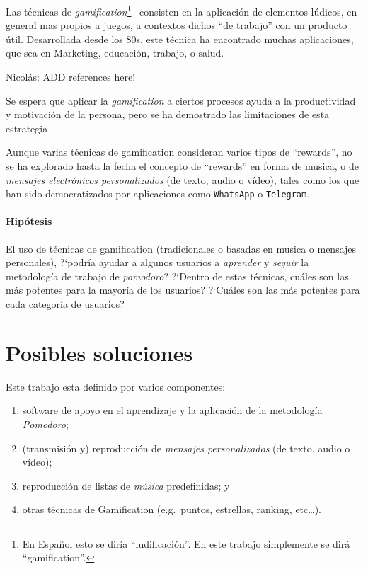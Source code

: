 \documentclass[12pt,letterpaper]{report}
\providecommand{\tightlist}{%
  \setlength{\itemsep}{0pt}\setlength{\parskip}{0pt}}
\let\oldparagraph\paragraph
\renewcommand{\paragraph}[1]{\oldparagraph{#1}\mbox{}}
\begin{document}
Las técnicas de \emph{gamification}\footnote{En Español esto se diría
``ludificación''. En este trabajo simplemente se dirá
``gamification''.}~\cite{deterding2011gamification} consisten en la aplicación de
elementos lúdicos, en general mas propios a juegos, a contextos dichos ``de
trabajo'' con un producto útil.  Desarrollada desde los 80s, este técnica ha
encontrado muchas aplicaciones, que sea en Marketing, educación, trabajo, o
salud.
\begin{TODO}
Nicolás: ADD references here!
\end{TODO}
Se espera que aplicar la \emph{gamification} a ciertos procesos ayuda a la
productividad y motivación de la persona, pero se ha demostrado las
limitaciones de esta estrategia~\cite{hamari2014gamification}.

Aunque varias técnicas de gamification consideran varios tipos de ``rewards'',
no se ha explorado hasta la fecha el concepto de ``rewards'' en forma de
musica, o de \emph{mensajes electrónicos personalizados} (de texto, audio o
vídeo), tales como los que han sido  democratizados por aplicaciones como
\texttt{WhatsApp} o \texttt{Telegram}.

\paragraph{Hipótesis}
El uso de técnicas de gamification (tradicionales o basadas en musica o
mensajes personales), ?`podría ayudar a algunos usuarios a \emph{aprender} y
\emph{seguir} la metodología de trabajo de \emph{pomodoro}? ?`Dentro de estas
técnicas, cuáles son las más potentes para la mayoría de los usuarios? ?`Cuáles
son las más potentes para cada categoría de usuarios?

\newpage
\hypertarget{posibles-soluciones}{%
\section{Posibles soluciones}\label{posibles-soluciones}}

Este trabajo esta definido por varios componentes:

\begin{enumerate}
\tightlist
\item software de apoyo en el aprendizaje y la aplicación de la metodología \emph{Pomodoro};
\item (transmisión y) reproducción de \emph{mensajes personalizados} (de texto, audio o vídeo);
\item reproducción de listas de \emph{música} predefinidas; y 
\item otras técnicas de Gamification (e.g.~puntos, estrellas, ranking, etc\ldots).
\end{enumerate}
\end{document}
